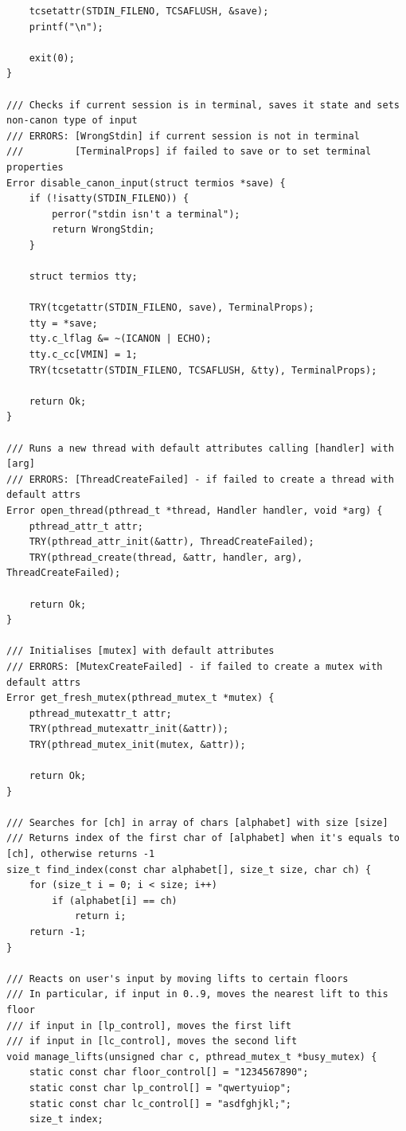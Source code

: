 \begin{verbatim}
    tcsetattr(STDIN_FILENO, TCSAFLUSH, &save);
    printf("\n");

    exit(0);
}

/// Checks if current session is in terminal, saves it state and sets non-canon type of input
/// ERRORS: [WrongStdin] if current session is not in terminal
///         [TerminalProps] if failed to save or to set terminal properties
Error disable_canon_input(struct termios *save) {
    if (!isatty(STDIN_FILENO)) {
        perror("stdin isn't a terminal");
        return WrongStdin;
    }

    struct termios tty;

    TRY(tcgetattr(STDIN_FILENO, save), TerminalProps);
    tty = *save;
    tty.c_lflag &= ~(ICANON | ECHO);
    tty.c_cc[VMIN] = 1;
    TRY(tcsetattr(STDIN_FILENO, TCSAFLUSH, &tty), TerminalProps);

    return Ok;
}

/// Runs a new thread with default attributes calling [handler] with [arg]
/// ERRORS: [ThreadCreateFailed] - if failed to create a thread with default attrs
Error open_thread(pthread_t *thread, Handler handler, void *arg) {
    pthread_attr_t attr;
    TRY(pthread_attr_init(&attr), ThreadCreateFailed);
    TRY(pthread_create(thread, &attr, handler, arg), ThreadCreateFailed);

    return Ok;
}

/// Initialises [mutex] with default attributes
/// ERRORS: [MutexCreateFailed] - if failed to create a mutex with default attrs
Error get_fresh_mutex(pthread_mutex_t *mutex) {
    pthread_mutexattr_t attr;
    TRY(pthread_mutexattr_init(&attr));
    TRY(pthread_mutex_init(mutex, &attr));

    return Ok;
}

/// Searches for [ch] in array of chars [alphabet] with size [size]
/// Returns index of the first char of [alphabet] when it's equals to [ch], otherwise returns -1
size_t find_index(const char alphabet[], size_t size, char ch) {
    for (size_t i = 0; i < size; i++)
        if (alphabet[i] == ch)
            return i;
    return -1;
}

/// Reacts on user's input by moving lifts to certain floors
/// In particular, if input in 0..9, moves the nearest lift to this floor
/// if input in [lp_control], moves the first lift
/// if input in [lc_control], moves the second lift
void manage_lifts(unsigned char c, pthread_mutex_t *busy_mutex) {
    static const char floor_control[] = "1234567890";
    static const char lp_control[] = "qwertyuiop";
    static const char lc_control[] = "asdfghjkl;";
    size_t index;


\end{verbatim}
